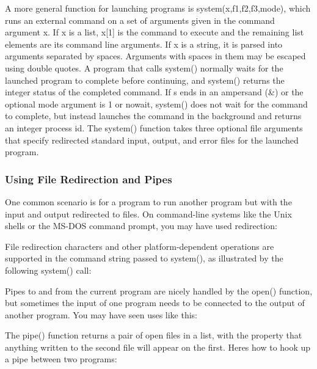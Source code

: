 A more general function for launching programs is
\textsf{system(x,f1,f2,f3,mode)}, which runs an external command on a
set of arguments given in the command argument \textsf{x}. If
\textsf{x} is a list, \textsf{x[1]} is the command to execute and the
remaining list elements are its command line arguments. If \textsf{x}
is a string, it is parsed into arguments separated by spaces. Arguments
with spaces in them may be escaped using double quotes. A program that
calls \textsf{system()} normally waits for the launched
program to complete before continuing, and \textsf{system()} returns
the integer status of the completed command. If \textsf{s} ends in an
ampersand (\textsf{\&}) or the optional \textsf{mode} argument is
\textsf{1} or \textsf{{\textquotedbl}nowait{\textquotedbl}},
\textsf{system()} does not wait for the command to complete, but
instead launches the command in the background and returns an integer
process id. The \textsf{system()} function takes three optional file
arguments that specify redirected standard input, output, and error
files for the launched program.

\subsubsection[Using File Redirection and Pipes]{Using File Redirection
and Pipes}

One common scenario is for a program to run
another program but with the input and output redirected to files. On
command-line systems like the Unix shells or the MS-DOS command prompt,
you may have used redirection:


File redirection characters and other platform-dependent operations are
supported in the command string passed to \textsf{system()}, as
illustrated by the following \textsf{system()} call:


Pipes to and from the current program are nicely handled by the
\textsf{open()} function, but sometimes the input of one program needs
to be connected to the output of another program. You may have seen
uses like this:


The \textsf{pipe()} function returns a pair of open files in a list,
with the property that anything written to the second file will appear
on the first. Here{\textquotesingle}s how to hook up a pipe between two
programs:

